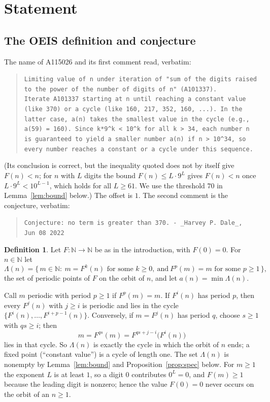 \documentclass[11pt]{amsart}
\theoremstyle{plain}
\theoremstyle{definition}
\newtheorem{definition}[theorem]{Definition}
\newcommand{\N}{\mathbb{N}}
\newcommand{\Cyc}{\Lambda}
\begin{document}
\section{Statement}\label{sec:statement}

\subsection*{The OEIS definition and conjecture}
The name of A115026 and its first comment read, verbatim:
\begin{quote}\raggedright\frenchspacing
{\small\texttt{Limiting value of n under iteration of "sum of the digits raised to the power of the number of digits of n" (A101337).}}\\[3pt]
{\small\texttt{Iterate A101337 starting at n until reaching a constant value (like 370) or a cycle (like 160, 217, 352, 160, ...). In the latter case, a(n) takes the smallest value in the cycle (e.g., a(59) = 160). Since k*9\textasciicircum{}k < 10\textasciicircum{}k for all k > 34, each number n is guaranteed to yield a smaller number a(n) if n > 10\textasciicircum{}34, so every number reaches a constant or a cycle under this sequence.}}
\end{quote}
(Its conclusion is correct, but the inequality quoted does not by itself give $F(n)<n$; for $n$ with $L$ digits the bound $F(n)\le L\cdot9^L$ gives $F(n)<n$ once $L\cdot9^L<10^{L-1}$, which holds for all $L\ge61$. We use the threshold $70$ in Lemma~\ref{lem:bound} below.)
The offset is $1$. The second comment is the conjecture, verbatim:
\begin{quote}\raggedright\frenchspacing
{\small\texttt{Conjecture: no term is greater than 370. - \_Harvey P. Dale\_, Jun~08~2022}}
\end{quote}

\begin{definition}\label{def:main}
Let $F\colon\N\to\N$ be as in the introduction, with $F(0)=0$. For $n\in\N$ let
\[
  \Cyc(n)=\{\,m\in\N:\ m=F^k(n)\text{ for some }k\ge0,\ \text{and}\ F^p(m)=m\text{ for some }p\ge1\,\},
\]
the set of periodic points of $F$ on the orbit of $n$, and let $a(n)=\min\Cyc(n)$.
\end{definition}

Call $m$ periodic with period $p\ge1$ if $F^p(m)=m$. If $F^i(n)$ has period $p$, then every $F^j(n)$ with $j\ge i$ is periodic and lies in the cycle $\{F^i(n),\dots,F^{i+p-1}(n)\}$. Conversely, if $m=F^j(n)$ has period $q$, choose $s\ge1$ with $qs\ge i$; then
\[
  m=F^{qs}(m)=F^{qs+j-i}\bigl(F^i(n)\bigr)
\]
lies in that cycle. So $\Cyc(n)$ is exactly the cycle in which the orbit of $n$ ends; a fixed point (``constant value'') is a cycle of length one. The set $\Cyc(n)$ is nonempty by Lemma~\ref{lem:bound} and Proposition~\ref{prop:spec} below.
For $m\ge1$ the exponent $L$ is at least $1$, so a digit $0$ contributes $0^L=0$, and $F(m)\ge1$ because the leading digit is nonzero; hence the value $F(0)=0$ never occurs on the orbit of an $n\ge1$.
\end{document}
